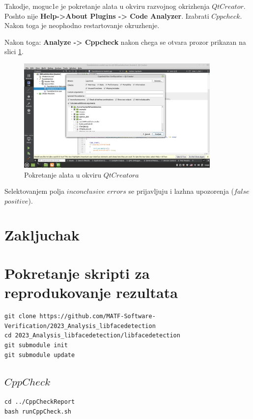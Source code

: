 \documentclass{article}
\begin{document}
\selectfont
Takodje, moguc1e je pokretanje alata u okviru razvojnog okrizhenja $QtCreator.$ Poshto nije 
\selectfont
\textbf{Help->About Plugins -> Code Analyzer}.
\selectfont
Izabrati $Cppcheck$. Nakon toga 
je neophodno restartovanje okruzhenje.

Nakon toga: 
\selectfont
\textbf{Analyze -> Cppcheck}
\selectfont
nakon chega se otvara prozor prikazan na slici \ref{qt:cppcheck}.

\begin{figure}[H]
    \centering
    \includegraphics[width=10cm]{img/cppCheck/cppCheckQt.png}
    \caption{Pokretanje alata u okviru $QtCreatora$}
    \label{qt:cppcheck}
\end{figure}

Selektovanjem polja $inconclusive$ $errors$ se prijavljuju i lazhna upozorenja ($false$ $positive$). 

\section{Zakljuchak}

\section{Pokretanje skripti za reprodukovanje rezultata}
\selectfont


\begin{verbatim}
git clone https://github.com/MATF-Software-Verification/2023_Analysis_libfacedetection
cd 2023_Analysis_libfacedetection/libfacedetection
git submodule init
git submodule update
\end{verbatim}

\subsection*{$CppCheck$}
\begin{verbatim}
cd ../CppCheckReport
bash runCppCheck.sh
\end{verbatim}
\end{document}
